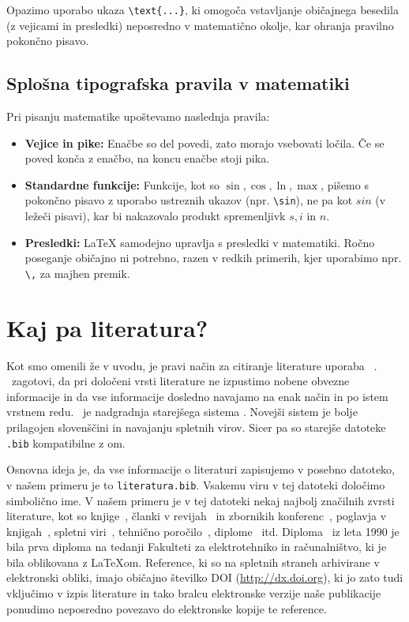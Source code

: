 \documentclass[a4paper,12pt,openright]{book}
\begin{document}
Opazimo uporabo ukaza \verb|\text{...}|, ki omogoča vstavljanje običajnega besedila (z vejicami in presledki) neposredno v matematično okolje, kar ohranja pravilno pokončno pisavo.

\section{Splošna tipografska pravila v matematiki}

Pri pisanju matematike upoštevamo naslednja pravila:
\begin{itemize}
    \item \textbf{Vejice in pike:} Enačbe so del povedi, zato morajo vsebovati ločila. Če se poved konča z enačbo, na koncu enačbe stoji pika.
    \item \textbf{Standardne funkcije:} Funkcije, kot so $\sin, \cos, \ln, \max$, pišemo s pokončno pisavo z uporabo ustreznih ukazov (npr. \verb|\sin|), ne pa kot $sin$ (v ležeči pisavi), kar bi nakazovalo produkt spremenljivk $s, i$ in $n$.
    \item \textbf{Presledki:} \LaTeX{} samodejno upravlja s presledki v matematiki. Ročno poseganje običajno ni potrebno, razen v redkih primerih, kjer uporabimo npr. \verb|\,| za majhen premik.
\end{itemize}


\chapter{Kaj pa literatura?}
\label{ch:lit}

Kot smo omenili že v uvodu, je pravi način za citiranje literature uporaba ~\cite{biblatex}.
\BibLaTeX\ zagotovi, da pri določeni vrsti literature ne izpustimo
nobene obvezne informacije
in da vse informacije dosledno navajamo na enak način in po istem vrstnem redu.
\BibLaTeX\ je nadgradnja starejšega sistema \BibTeX. Novejši sistem je bolje prilagojen slovenščini in navajanju spletnih virov. Sicer pa so starejše datoteke \texttt{.bib} kompatibilne z \BibLaTeX om.

Osnovna ideja  je, da vse informacije o literaturi zapisujemo v posebno datoteko, v našem primeru je to \texttt{literatura.bib}.
Vsakemu viru v tej datoteki določimo simbolično ime.
V  našem primeru je v tej datoteki nekaj najbolj značilnih zvrsti literature, kot so knjige~\cite{lamport},
članki v revijah~\cite{leonardo} in zbornikih konferenc~\cite{ciuha2010visualization},
poglavja v knjigah~\cite{poglavje_springer},
spletni viri~\cite{slovarji,video},
tehnično poročilo~\cite{andersen2012kinect},
diplome~\cite{diploma} itd.
Diploma~\cite{diploma} iz leta 1990 je bila prva diploma na tedanji Fakulteti za elektrotehniko in računalništvo, ki je bila oblikovana z \LaTeX om.
Reference, ki so na spletnih straneh arhivirane v elektronski obliki, imajo običajno  \v stevilko DOI (\url{http://dx.doi.org}), ki jo zato tudi vključimo v izpis literature in tako bralcu elektronske verzije naše publikacije ponudimo neposredno povezavo do elektronske kopije te reference.
\end{document}
